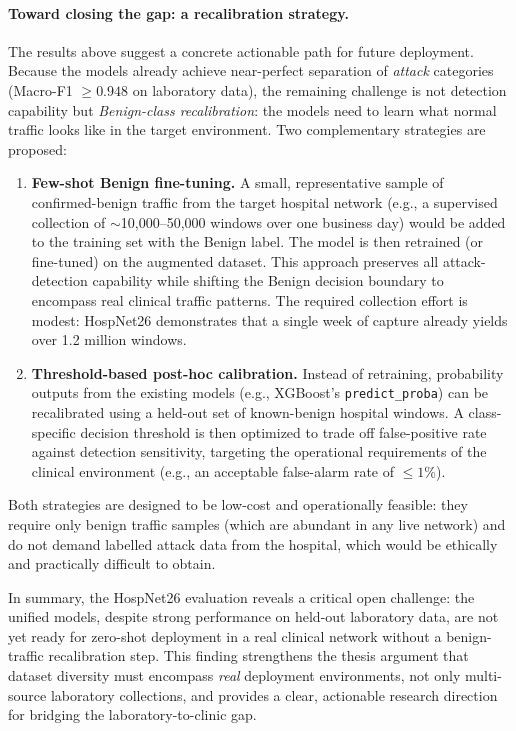\paragraph{Toward closing the gap: a recalibration strategy.}
The results above suggest a concrete actionable path for future deployment. Because the models already achieve near-perfect separation of \emph{attack} categories (Macro-F1 $\geq 0.948$ on laboratory data), the remaining challenge is not detection capability but \emph{Benign-class recalibration}: the models need to learn what normal traffic looks like in the target environment. Two complementary strategies are proposed:

\begin{enumerate}[nosep]
  \item \textbf{Few-shot Benign fine-tuning.} A small, representative sample of confirmed-benign traffic from the target hospital network (e.g., a supervised collection of $\sim$10{,}000--50{,}000 windows over one business day) would be added to the training set with the Benign label. The model is then retrained (or fine-tuned) on the augmented dataset. This approach preserves all attack-detection capability while shifting the Benign decision boundary to encompass real clinical traffic patterns. The required collection effort is modest: HospNet26 demonstrates that a single week of capture already yields over 1.2 million windows.

  \item \textbf{Threshold-based post-hoc calibration.} Instead of retraining, probability outputs from the existing models (e.g., XGBoost's \texttt{predict\_proba}) can be recalibrated using a held-out set of known-benign hospital windows. A class-specific decision threshold is then optimized to trade off false-positive rate against detection sensitivity, targeting the operational requirements of the clinical environment (e.g., an acceptable false-alarm rate of $\leq 1$\%).
\end{enumerate}

Both strategies are designed to be low-cost and operationally feasible: they require only benign traffic samples (which are abundant in any live network) and do not demand labelled attack data from the hospital, which would be ethically and practically difficult to obtain.

In summary, the HospNet26 evaluation reveals a critical open challenge: the unified models, despite strong performance on held-out laboratory data, are not yet ready for zero-shot deployment in a real clinical network without a benign-traffic recalibration step. This finding strengthens the thesis argument that dataset diversity must encompass \emph{real} deployment environments, not only multi-source laboratory collections, and provides a clear, actionable research direction for bridging the laboratory-to-clinic gap.

